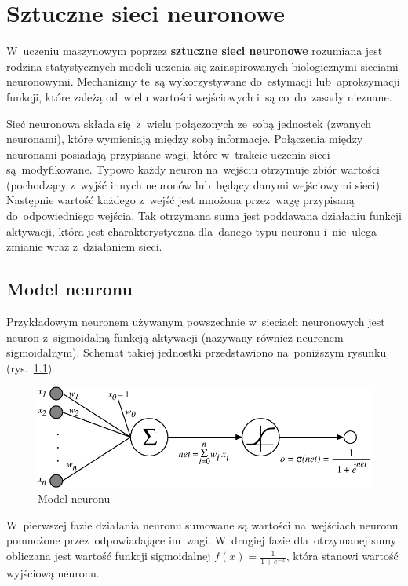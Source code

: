 \chapter{Sztuczne sieci neuronowe}
W~uczeniu maszynowym poprzez \textbf{sztuczne sieci neuronowe} rozumiana jest rodzina statystycznych modeli
uczenia się zainspirowanych biologicznymi sieciami neuronowymi. Mechanizmy te~są wykorzystywane do~estymacji
lub~aproksymacji funkcji, które zależą od~wielu wartości wejściowych i~są co~do~zasady nieznane.

Sieć neuronowa składa się~z~wielu połączonych ze~sobą jednostek (zwanych neuronami), które wymieniają między
sobą informacje. Połączenia między neuronami posiadają przypisane wagi, które w~trakcie uczenia sieci
są~modyfikowane. Typowo każdy neuron na~wejściu otrzymuje zbiór wartości (pochodzący z~wyjść innych neuronów
lub~będący danymi wejściowymi sieci). Następnie wartość każdego z~wejść jest mnożona przez~wagę przypisaną
do~odpowiedniego wejścia. Tak otrzymana suma jest poddawana działaniu funkcji aktywacji, która jest
charakterystyczna dla~danego typu neuronu i~nie~ulega zmianie wraz z~działaniem sieci.

\section{Model neuronu}
Przykładowym neuronem używanym powszechnie w~sieciach neuronowych jest neuron z~sigmoidalną funkcją aktywacji
(nazywany również neuronem sigmoidalnym). Schemat takiej jednostki przedstawiono na~poniższym rysunku
(rys.~\ref{img:model-neuronu}).

\begin{figure}[H]
	\centering
	\includegraphics[width=\linewidth]{img/sigmoid-neuron.png}
	\caption{Model neuronu}
	\label{img:model-neuronu}
\end{figure}

W~pierwszej fazie działania neuronu sumowane są wartości na~wejściach neuronu pomnożone przez~odpowiadające
im~wagi. W~drugiej fazie dla~otrzymanej sumy obliczana jest wartość funkcji sigmoidalnej
$f(x)=\frac{1}{1+e^{-x}}$, która stanowi wartość wyjściową neuronu.

